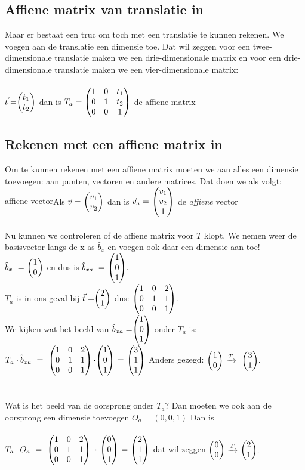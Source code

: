 \subsection{Affiene  matrix van translatie in \RT}
Maar er bestaat een truc om  toch met een translatie te kunnen rekenen. We voegen aan de translatie een dimensie toe. Dat wil zeggen voor een twee-dimensionale translatie maken we een drie-dimensionale matrix en voor een drie-dimensionale translatie maken we een  vier-dimensionale matrix:\\ \\ 
 { $\vec{t} = \vectweesnel{t} $  \quad  dan is 
	$ T_a = \begin{pmatrix}  1 & 0 & t_1  \\  0 & 1 & t_2  \\ 0 & 0 & 1  \end{pmatrix} $ \quad de affiene matrix  } \\
\subsection{Rekenen met een affiene  matrix in \RT}
Om te kunnen rekenen met een affiene matrix moeten we aan alles een dimensie toevoegen: aan punten, vectoren en andere matrices. Dat doen we als volgt: 
\mydef
{affiene vector}{Als  $\vec{v} = \ \vectweesnel{v} $ dan  is 
	$\vec{v}_a = \  \vecdrie{v_1}{v_2}{1}  $ \quad de \textit{affiene} vector } \\
 \\
Nu kunnen we  controleren of de affiene matrix voor $T$ klopt. We nemen weer de basisvector langs de x-as $ \hat{b}_x $ en voegen ook daar een dimensie aan toe! \\
$ \hat{b}_x \ = \ \vectwee{1}{0} $ en dus is  
$ \hat{b}_{xa} \ = \  \vecdrie{1}{0}{1}. $ \\
$T_a$ is in ons geval bij $ \vec{t}=  \vectwee{2}{1} $ dus: $ \begin{pmatrix}  1 & 0 &  2  \\  0 & 1 & 1  \\ 0 & 0 & 1  \end{pmatrix} $. \\
We kijken wat het beeld van $ \hat{b}_{xa} = \vecdrie{1}{0}{1} $ onder \textit{$ T_a $} is: \\
$ T_a \cdot \hat{b}_{xa} \ 
= \ \matdrie{ 1 & 0 &  2 }{ 0 & 1 & 1 }{0 & 0 & 1 }  \cdot \vecdrie{1}{0}{1} \ 
=  \ \vecdrie{3}{1}{1} $  
\quad  Anders gezegd: \quad $ \vectwee{1}{0}  \  \xrightarrow{T}   \ \   \vectwee{ 3 } {1}. $\\ \\ \\
Wat is het beeld van de oorsprong onder \textit{$  T_a $}? Dan moeten we ook aan de oorsprong een dimensie toevoegen $ O_a = (0,0,1) $ Dan is \\ \\
$ T_a \cdot O_a \ 
= \ \matdrie{ 1 & 0 &  2 }{ 0 & 1 & 1 }{0 & 0 & 1 }  \ \cdot \ \vecdrie{0}{0}{1} \ 
=  \ \vecdrie{2}{1}{1} $ 
\quad dat wil zeggen \quad
$ \vectwee{0}{0}  \  \xrightarrow{T}   \   \vectwee{ 2 } {1}. $\\

